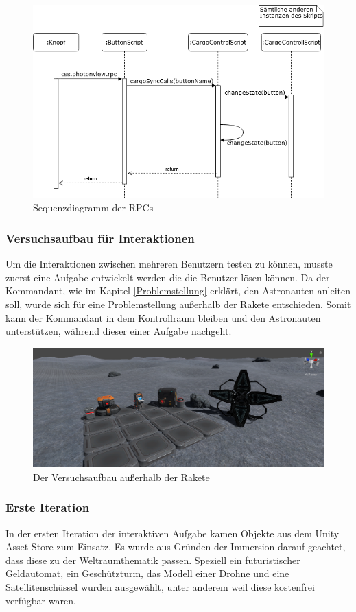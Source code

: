 \begin{figure}[H]
\centering
\includegraphics[width=1\textwidth]{RPC.PNG}
\caption{Sequenzdiagramm der RPCs}
\end{figure}

\subsubsection{Versuchsaufbau für Interaktionen}
Um die Interaktionen zwischen mehreren Benutzern testen zu können, musste zuerst eine Aufgabe entwickelt werden die die Benutzer lösen können. Da der Kommandant, wie im Kapitel \ref{Problemstellung} erklärt, den Astronauten anleiten soll, wurde sich für eine Problemstellung außerhalb der Rakete entschieden. Somit kann der Kommandant in dem Kontrollraum bleiben und den Astronauten unterstützen, während dieser einer Aufgabe nachgeht.

\begin{figure}[H]
\centering
\includegraphics[width=1\textwidth]{InteraktionStation.PNG}
\caption{Der Versuchsaufbau außerhalb der Rakete}
\end{figure}

\subsubsection*{Erste Iteration}
In der ersten Iteration der interaktiven Aufgabe kamen Objekte aus dem Unity Asset Store zum Einsatz. Es wurde aus Gründen der Immersion darauf geachtet, dass diese zu der Weltraumthematik passen. Speziell ein futuristischer Geldautomat, ein Geschützturm, das Modell einer Drohne und eine Satellitenschüssel wurden ausgewählt, unter anderem weil diese kostenfrei verfügbar waren. 

